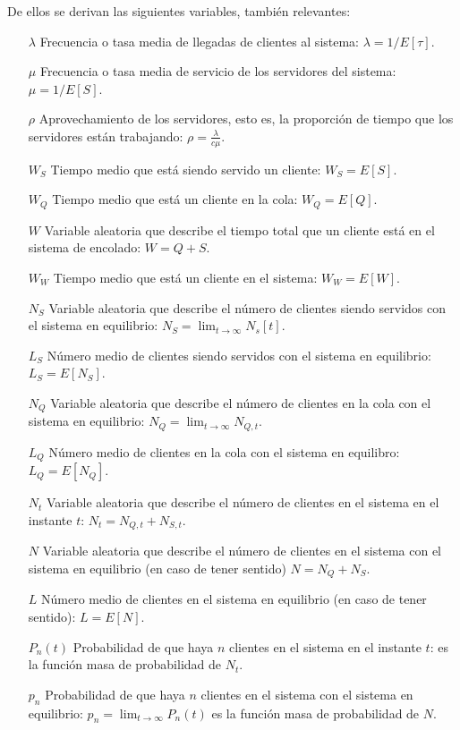 \documentclass[a4paper,10pt]{scrartcl}
\theoremstyle{definition}
\numberwithin{equation}{section}
\begin{document}
De ellos se derivan las siguientes variables, también relevantes:
\begin{itemize}
\item [$\lambda$]
  Frecuencia o tasa media de llegadas de clientes al sistema: $\lambda = 1/E[\tau]$.
\item [$\mu$]
  Frecuencia o tasa media de servicio de los servidores del sistema: $\mu = 1/E[S]$.
\item [$\rho$]
  Aprovechamiento de los servidores, esto es, la proporción de tiempo que los servidores están trabajando: $\rho = \frac{\lambda}{c\mu}$.
\item [$W_S$]
  Tiempo medio que está siendo servido un cliente: $W_S  = E[S]$.
\item [$W_Q$]
  Tiempo medio que está un cliente en la cola: $W_Q = E[Q]$.
\item [$W$]
  Variable aleatoria que describe el tiempo total que un cliente está en el sistema de encolado: $W = Q+S$.
\item [$W_W$]
  Tiempo medio que está un cliente en el sistema: $W_W = E[W]$.
\item [$N_S$]
  Variable aleatoria que describe el número de clientes siendo servidos con el sistema en equilibrio: $N_S = \lim_{t \rightarrow \infty} N_s[t]$.
\item [$L_S$]
  Número medio de clientes siendo servidos con el sistema en equilibrio: \\ $L_S = E[N_S]$.
\item [$N_Q$]
  Variable aleatoria que describe el número de clientes en la cola con el sistema en equilibrio: $N_Q = \lim_{t \rightarrow \infty} N_{Q,t}$.
\item [$L_Q$]
  Número medio de clientes en la cola con el sistema en equilibro: $L_Q = E[N_Q]$.
\item [$N_t$]
  Variable aleatoria que describe el número de clientes en el sistema en el instante $t$: $N_t = N_{Q,t} + N_{S,t}$.
\item [$N$]
  Variable aleatoria que describe el número de clientes en el sistema con el sistema en equilibrio (en caso de tener sentido) $N = N_Q + N_S$.
\item [$L$]
  Número medio de clientes en el sistema en equilibrio (en caso de tener sentido): $L = E[N]$.
\item [$P_n(t)$]
  Probabilidad de que haya $n$ clientes en el sistema en el instante $t$: es la función masa de probabilidad de $N_t$.
\item [$p_n$]
  Probabilidad de que haya $n$ clientes en el sistema con el sistema en equilibrio: $p_n = \lim_{t \rightarrow \infty} P_n(t)$ es la función masa de probabilidad de $N$.
\end{itemize}
\end{document}
